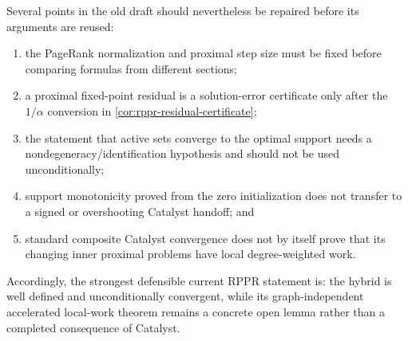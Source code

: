 Several points in the old draft should nevertheless be repaired before its
arguments are reused:
\begin{enumerate}[label=(\alph*),leftmargin=2em]
  \item the PageRank normalization and proximal step size must be fixed before
        comparing formulas from different sections;
  \item a proximal fixed-point residual is a solution-error certificate only
        after the $1/\alpha$ conversion in
        \cref{cor:rppr-residual-certificate};
  \item the statement that active sets converge to the optimal support needs a
        nondegeneracy/identification hypothesis and should not be used
        unconditionally;
  \item support monotonicity proved from the zero initialization does not
        transfer to a signed or overshooting Catalyst handoff; and
  \item standard composite Catalyst convergence does not by itself prove that
        its changing inner proximal problems have local degree-weighted work.
\end{enumerate}

Accordingly, the strongest defensible current RPPR statement is: the hybrid is
well defined and unconditionally convergent, while its graph-independent
accelerated local-work theorem remains a concrete open lemma rather than a
completed consequence of Catalyst.
